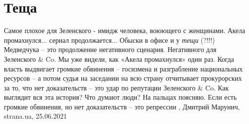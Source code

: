  
 
 
 
 
\chapter{Теща}
\label{sec:slova.tescha}

Самое плохое для Зеленского - имидж человека, воюющего с женщинами.  Акела
промахнулся... сериал продолжается... Обыски в офисе и у \emph{тещи} (?!!!) Медведчука –
это продолжение негативного сценария. Негативного для Зеленского \& Co.  Мы уже
видели, как «Акела промахнулся» один раз. Когда власть выдвигает громкие
обвинения – госизмена и разграбление национальных ресурсов – а потом судья на
заседании на всю страну отчитывает прокурорских за то, что нет доказательств –
это удар по репутации Зеленского \& Co.  Как выглядит вся эта история? Что
думают люди? На пальцах поясняю.  Если есть громкие обвинения, но нет
доказательств – это репрессии
, 
Дмитрий Марунич, strana.ua, 25.06.2021
